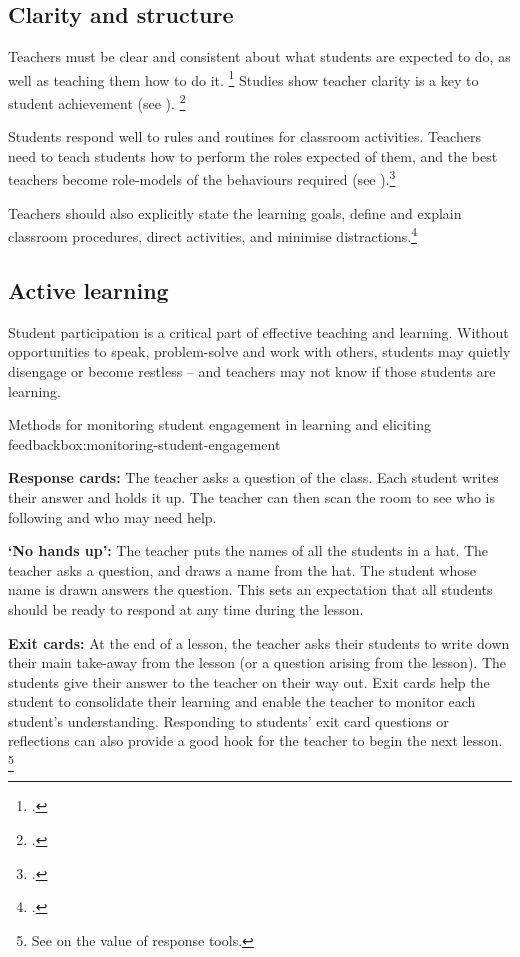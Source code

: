 \documentclass[FrontPage]{grattan}
\begin{document}
\subsection{Clarity and structure}\label{subsec:clarity-and-structure}
Teachers must be clear and consistent about what students are expected to do, as well as teaching them how to do it.%
    \footcites{Marzano2003ClassroomManagementWorks}{Simonsen2008EvidenceBasedPractices} 
Studies show teacher clarity is a key to student achievement (see ).%
    \footcite{Hattie2008visiblelearningsynthesis}

Students respond well to rules and routines for classroom activities. Teachers need to teach students how to perform the roles expected of them, and the best teachers become role-models of the behaviours required (see ).\footcite{Brophy2006HistoryResearchClassroom}

Teachers should also explicitly state the learning goals, define and explain classroom procedures, direct activities, and minimise distractions.\footcites{Greenberg2014TrainingOurFuture}{Marzano2003ClassroomManagementWorks}{Simonsen2008EvidenceBasedPractices}

\subsection{Active learning}\label{subsec:active-learning}
Student participation is a critical part of effective teaching and learning. Without opportunities to speak, problem-solve and work with others, students may quietly disengage or become restless -- and teachers may not know if those students are learning. 

\begin{verysmallbox}[!t]{Methods for monitoring student engagement in learning and eliciting feedback}{box:monitoring-student-engagement}

\textbf{Response cards:} The teacher asks a question of the class. Each student writes their answer and holds it up. The teacher can then scan the room to see who is following and who may need help. 

\textbf{‘No hands up':} The teacher puts the names of all the students in a hat. The teacher asks a question, and draws a name from the hat. The student whose name is drawn answers the question. This sets an expectation that all students should be ready to respond at any time during the lesson.

\textbf{Exit cards:} At the end of a lesson, the teacher asks their students to write down their main take-away from the lesson (or a question arising from the lesson). The students give their answer to the teacher on their way out. Exit cards help the student to consolidate their learning and enable the teacher to monitor each student's understanding. Responding to students' exit card questions or reflections can also provide a good hook for the teacher to begin the next lesson.%
\footnote{See \textcite{Simonsen2008EvidenceBasedPractices} on the value of response tools.}

\end{verysmallbox}
\end{document}
